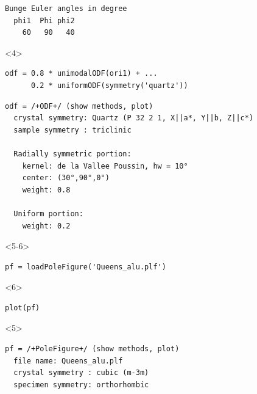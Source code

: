 \documentclass[comptress]{beamer}
\begin{document}
\begin{frame}[fragile]
\begin{overlayarea}{\textwidth}{5.5cm}
\begin{onlyenv}
\begin{lstlisting}[style=output]
  Bunge Euler angles in degree
  phi1  Phi phi2
    60   90   40
  \end{lstlisting}
  \end{onlyenv}
  \begin{onlyenv}<4>
    \begin{lstlisting}[style=input]
odf = 0.8 * unimodalODF(ori1) + ...
      0.2 * uniformODF(symmetry('quartz'))
  \end{lstlisting}
  \vspace{-0.2cm}
  \begin{lstlisting}[style=output]
odf = /+ODF+/ (show methods, plot)
  crystal symmetry: Quartz (P 32 2 1, X||a*, Y||b, Z||c*)
  sample symmetry : triclinic

  Radially symmetric portion:
    kernel: de la Vallee Poussin, hw = 10°
    center: (30°,90°,0°)
    weight: 0.8

  Uniform portion:
    weight: 0.2
  \end{lstlisting}
\end{onlyenv}

\begin{onlyenv}<5-6>
  \begin{lstlisting}[style=input]
pf = loadPoleFigure('Queens_alu.plf')
  \end{lstlisting}
\end{onlyenv}
\begin{onlyenv}<6>
  \vspace{-0.3cm}
  \begin{lstlisting}[style=input]
plot(pf)
  \end{lstlisting}
\end{onlyenv}
\begin{onlyenv}<5>
\begin{lstlisting}[style=output]
pf = /+PoleFigure+/ (show methods, plot)
  file name: Queens_alu.plf
  crystal symmetry : cubic (m-3m)
  specimen symmetry: orthorhombic


\end{lstlisting}
\end{onlyenv}
\end{overlayarea}
\end{frame}
\end{document}

